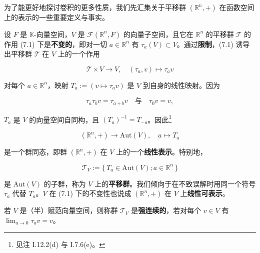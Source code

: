 为了能更好地探讨卷积的更多性质，我们先汇集关于平移群 $ (\mathbb{R}^{n},+) $ 在函数空间上的表示的一些重要定义与事实。

设 $ F $ 是 $ \mathbb{K} $-向量空间，$ V $ 是 $ \mathcal{F}(\mathbb{R}^{n},F) $ 的向量子空间，且它在 $ \mathbb{R}^{n} $ 的平移群 $ \mathcal{T} $ 的作用 (7.1) 下是\textbf{不变的}，即对一切 $ a \in \mathbb{R}^{n} $ 有 $ \tau_{a}(V) \subset V $。通过\textbf{限制}，(7.1) 诱导出平移群 $ \mathcal{T} $ 在 $ V $ 上的一个作用

\[
\mathcal{T} \times V \to V , \quad (\tau_{a},v) \mapsto \tau_{a}v
\]

对每个 $ a \in \mathbb{R}^{n} $，映射 $ T_{a} := (v \mapsto \tau_{a}v) $ 是 $ V $ 到自身的线性映射。因为

\[
\tau_{a}\tau_{b}v = \tau_{a+b}v \quad \text{与} \quad \tau_{0}v = v ,
\]

$ T_{a} $ 是 $ V $ 的向量空间自同构，且 $ (T_{a})^{-1} = T_{-a} $。因此\footnote{见注 I.12.2(d) 与 I.7.6(e)。}

\[
(\mathbb{R}^{n},+) \to \mathrm{Aut}(V) , \quad a \mapsto T_{a}
\]

是一个群同态，即群 $ (\mathbb{R}^{n},+) $ 在 $ V $ 上的一个\textbf{线性表示}。特别地，

\[
\mathcal{T}_{V} := \{\, T_{a} \in \mathrm{Aut}(V) ; a \in \mathbb{R}^{n} \,\}
\]

是 $ \mathrm{Aut}(V) $ 的子群，称为 $ V $ 上的\textbf{平移群}。我们倾向于在不致误解时用同一个符号 $ \tau_{a} $ 代替 $ T_{a} $。$ V $ 在 (7.1) 下的不变性也说成 $ (\mathbb{R}^{n},+) $ 在 $ V $ 上\textbf{线性可表示}。

若 $ V $ 是（半）赋范向量空间，则称群 $ \mathcal{T}_{V} $ 是\textbf{强连续的}，若对每个 $ v \in V $ 有 $ \lim_{a \to 0}\tau_{a}v = v $。

